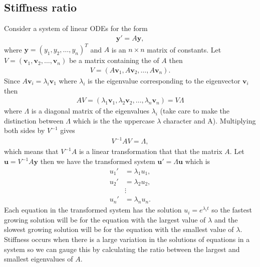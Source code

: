 \documentclass[letterpaper,10pt,english]{jupyterBook}
\begin{document}
\subsection{Stiffness ratio}
\label{\detokenize{4_Stability/4.0_Stability:stiffness-ratio}}
\sphinxAtStartPar
Consider a system of linear ODEs for the form
\begin{align*}
    \mathbf{y}' = A \mathbf{y},
\end{align*}
\sphinxAtStartPar
where \(\mathbf{y} = (y_1, y_2, \ldots, y_n)^T\) and \(A\) is an \(n \times n\) matrix of constants. Let \(V = (\mathbf{v}_1, \mathbf{v}_2, \ldots, \mathbf{v}_n)\) be a matrix containing the  of \(A\) then
\begin{equation*}
\begin{split}V = (A \mathbf{v}_1, A \mathbf{v}_2, \ldots, A \mathbf{v}_n).\end{split}
\end{equation*}
\sphinxAtStartPar
Since \(A \mathbf{v}_i = \lambda_i \mathbf{v}_1\) where \(\lambda_i\) is the eigenvalue corresponding to the eigenvector \(\mathbf{v}_i\) then
\begin{align*}
    AV = (\lambda_1 \mathbf{v}_1, \lambda_2 \mathbf{v}_2, \ldots, \lambda_n \mathbf{v}_n) = V \Lambda
\end{align*}
\sphinxAtStartPar
where \(\Lambda\) is a diagonal matrix of the eigenvalues \(\lambda_i\) (take care to make the distinction between \(\Lambda\) which is the the uppercase \(\lambda\) character and A). Multiplying both sides by \(V^{-1}\) gives
\begin{align*}
    V^{-1} A V = \Lambda,
\end{align*}
\sphinxAtStartPar
which means that \(V^{-1} A\) is a linear transformation that that  the matrix \(A\). Let \(\mathbf{u} = V^{-1} A \mathbf{y}\) then we have the transformed system \(\mathbf{u}' = \Lambda \mathbf{u}\) which is
\begin{align*}
    u_1' &= \lambda_1 u_1, \\
    u_2' &= \lambda_2 u_2, \\
    &\vdots \\
    u_n' &= \lambda_n u_n.
\end{align*}
\sphinxAtStartPar
Each equation in the transformed system has the solution \(u_i = e^{\lambda_i t}\) so the fastest growing solution will be for the equation with the largest value of \(\lambda\) and the slowest growing solution will be for the equation with the smallest value of \(\lambda\). Stiffness occurs when there is a large variation in the solutions of equations in a system so we can gauge this by calculating the ratio between the largest and smallest eigenvalues of \(A\).
\end{document}
